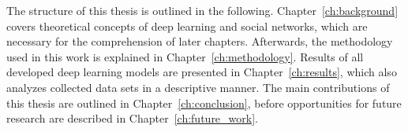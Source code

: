 
The structure of this thesis is outlined in the following.
Chapter~\ref{ch:background} covers theoretical concepts of deep learning and
social networks, which are necessary for the comprehension of later chapters.
Afterwards, the methodology used in this work is explained in Chapter~\ref{ch:methodology}.
Results of all developed deep learning models are presented in Chapter~\ref{ch:results},
which also analyzes collected data sets in a descriptive manner.
The main contributions of this thesis are outlined in Chapter~\ref{ch:conclusion},
before opportunities for future research are described in Chapter~\ref{ch:future_work}.
